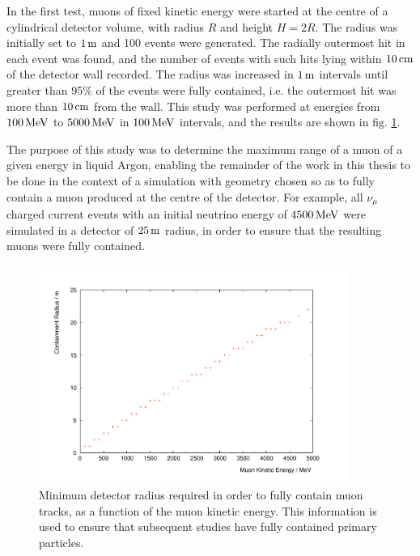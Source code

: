 In the first test, muons of fixed kinetic energy were started at the centre of a cylindrical detector volume, with radius $R$ and height $H=2R$. The radius was initially set to $1\metre$ and 100 events were generated. The radially outermost hit in each event was found, and the number of events with such hits lying within $10\cm$ of the detector wall recorded. The radius was increased in $1\metre$ intervals until greater than 95\% of the events were fully contained, i.e. the outermost hit was more than $10\cm$ from the wall. This study was performed at energies from $100\MeV$ to $5000\MeV$ in $100\MeV$ intervals, and the results are shown in fig. \ref{fig:lamu-containment-radius}.

The purpose of this study was to determine the maximum range of a muon of a given energy in liquid Argon, enabling the remainder of the work in this thesis to be done in the context of a simulation with geometry chosen so as to fully contain a muon produced at the centre of the detector. For example, all $\nu_\mu$ charged current events with an initial neutrino energy of $4500\MeV$ were simulated in a detector of $25\metre$ radius, in order to ensure that the resulting muons were fully contained.

\begin{figure}
\centering
\includegraphics[angle=-90,width=0.9\textwidth]{chapters/detectorphysics_images/containment_radius}
\caption[Detector radius required for full containment as a function of energy]{\label{fig:lamu-containment-radius}Minimum detector radius required in order to fully contain muon tracks, as a function of the muon kinetic energy. This information is used to ensure that subsequent studies have fully contained primary particles.}
\end{figure}

